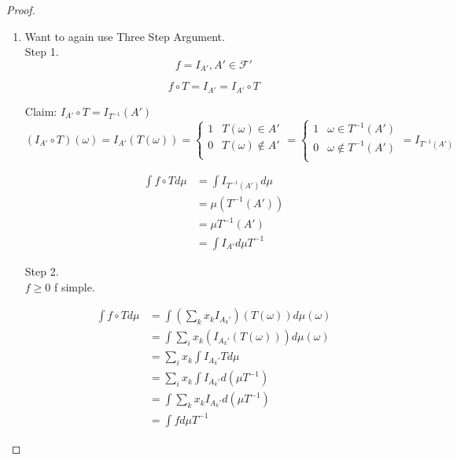 \documentclass[11pt,fleqn]{book} %
\begin{document}
\begin{proof}
	\begin{enumerate}
		\item  Want to again use Three Step Argument.\\

			Step 1. \\

					$$f = I_{A'}, A' \in \mathcal{F}'$$

					$$ f \circ T = I_{A'} = I_{A'} \circ T$$

			Claim: $I_{A'} \circ T = I_{T^{-1}}(A')$\\

					$$(I_{A'} \circ T)(\omega) = I_{A'}(T(\omega)) = \left\{\begin{array}{ll}
						1 & T(\omega) \in A'\\
						0 & T(\omega) \notin A'\\
					\end{array} \right. = \left\{\begin{array}{ll}
						1 & \omega \in T^{-1}(A')\\
						0 & \omega \notin T^{-1}(A')\\
					\end{array} \right. = I_{T^{-1}(A')} $$

			$$\begin{aligned}
							\int f \circ T d\mu &= \int I_{T^{-1}(A')}d\mu\\
								&= \mu(T^{-1}(A'))\\
								&= \mu T^{-1}(A')	\\
								&= \int I_{A'} d\mu T^{-1}		
						\end{aligned}$$

			Step 2.\\

			$f \geq 0$ f simple. 

					$$\begin{aligned}
						\int f \circ T d\mu &= \int (\sum_k x_k I_{A_k'}) (T(\omega)) d\mu(\omega)\\
								&= \int \sum_i x_k (I_{A_k'} (T(\omega))) d\mu(\omega)\\
								&=\sum_i x_k \int  I_{A_k'} T d\mu\\
								&= \sum_i x_k \int  I_{A_k'}  d(\mu T^{-1})\\
								&= \int \sum_k x_k I_{A_k'}  d(\mu T^{-1})\\
								&=\int f d\mu T^{-1}
					\end{aligned} $$ 	


\end{enumerate}
\end{proof}
\end{document}
